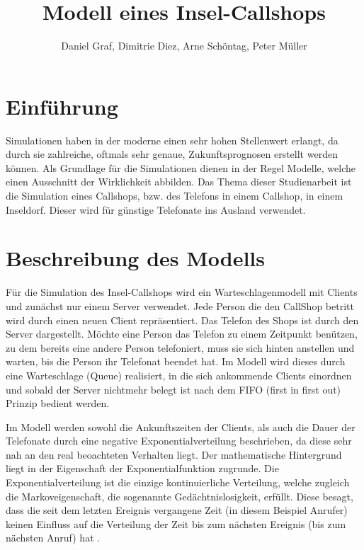 

\title{Modell eines Insel-Callshops}
\providecommand{\subtitle}[1]{}
\subtitle{2. Projekt zu Modellierung und Simulation}
\author{Daniel Graf, Dimitrie Diez, Arne Schöntag, Peter Müller}
\date{}



\maketitle

\tableofcontents
\section{Einführung}
Simulationen haben in der moderne einen sehr hohen Stellenwert erlangt, da durch sie zahlreiche, oftmals sehr genaue, Zukunftsprognosen erstellt werden können. Als Grundlage für die Simulationen dienen in der Regel Modelle, welche einen Ausschnitt der Wirklichkeit abbilden. Das Thema dieser Studienarbeit ist die Simulation eines Callshops, bzw. des Telefons in einem Callshop, in einem Inseldorf. Dieser wird für günstige Telefonate ins Ausland verwendet. 

\section{Beschreibung des Modells}
Für die Simulation des Insel-Callshops wird ein Warteschlagenmodell mit Clients und zunächst nur einem Server verwendet. Jede Person die den CallShop betritt wird durch einen neuen Client repräsentiert. Das Telefon des Shops ist durch den Server dargestellt. Möchte eine Person das Telefon zu einem Zeitpunkt benützen, zu dem bereits eine andere Person telefoniert, muss sie sich hinten anstellen und warten, bis die Person ihr Telefonat beendet hat. Im Modell wird dieses durch eine Warteschlage (Queue) realisiert, in die sich ankommende Clients einordnen und sobald der Server nichtmehr belegt ist nach dem FIFO (first in first out) Prinzip bedient werden. 

Im Modell werden sowohl die Ankunftszeiten der Clients, als auch die Dauer der Telefonate durch eine negative Exponentialverteilung beschrieben, da diese sehr nah an den real beoachteten Verhalten liegt. Der mathematische Hintergrund liegt in der Eigenschaft der Exponentialfunktion zugrunde. Die Exponentialverteilung ist die einzige kontinuierliche Verteilung, welche zugleich die Markoveigenschaft, die sogenannte Gedächtnislosigkeit, erfüllt. Diese besagt, dass die seit dem letzten Ereignis vergangene Zeit (in diesem Beispiel Anrufer) keinen Einfluss auf die Verteilung der Zeit bis zum nächsten Ereignis (bis zum nächsten Anruf) hat \cite{ExpoVert}. 

